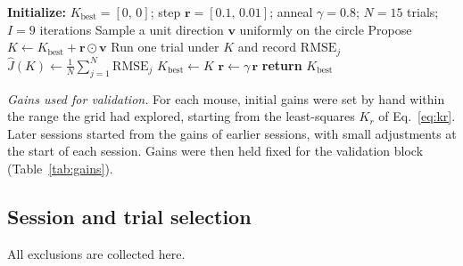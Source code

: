 \begin{algorithm}[h]
\caption{Zeroth-order controller gain search}
\label{alg:zo}
\begin{algorithmic}[1]
\State \textbf{Initialize:} $K_{\text{best}} = [0,\,0]$; step
       $\mathbf{r} = [0.1,\,0.01]$; anneal $\gamma = 0.8$; $N = 15$ trials;
       $I = 9$ iterations
    \State Sample a unit direction $\mathbf{v}$ uniformly on the circle
    \State Propose $K \leftarrow K_{\text{best}} + \mathbf{r}\odot\mathbf{v}$
        \State Run one trial under $K$ and record $\mathrm{RMSE}_j$
    \EndFor
    \State $\hat{J}(K) \leftarrow \frac{1}{N}\sum_{j=1}^{N}\mathrm{RMSE}_j$
        \State $K_{\text{best}} \leftarrow K$
    \EndIf
    \State $\mathbf{r} \leftarrow \gamma\,\mathbf{r}$
\EndFor
\State \textbf{return} $K_{\text{best}}$
\end{algorithmic}
\end{algorithm}

\emph{Gains used for validation.} For each mouse, initial gains were set by hand
within the range the grid had explored, starting from the least-squares $K_r$
of Eq.~\eqref{eq:kr}. Later sessions started from the gains of earlier sessions,
with small adjustments at the start of each session. Gains were then held fixed
for the validation block (Table~\ref{tab:gains}).

\subsection*{Session and trial selection}

All exclusions are collected here.

